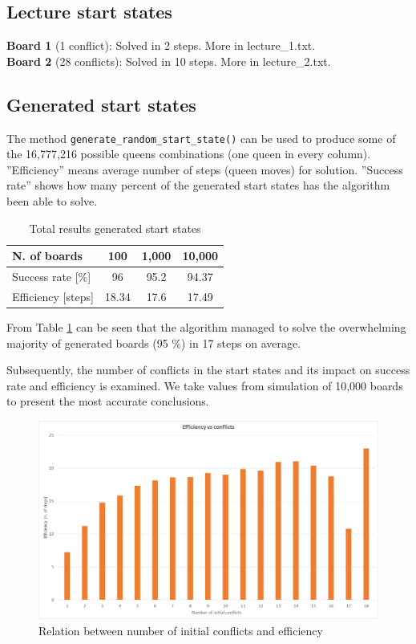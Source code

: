\documentclass[a4paper]{article}
\begin{document}
\subsection{Lecture start states}
\textbf{Board 1} (1 conflict): Solved in 2 steps. More in lecture\_1.txt. \\
\textbf{Board 2} (28 conflicts): Solved in 10 steps. More in lecture\_2.txt.

\subsection{Generated start states}
The method \verb|generate_random_start_state()| can be used to produce some of the 16,777,216 possible queens combinations  (one queen in every column). ''Efficiency'' means average number of steps (queen moves) for solution. ''Success rate'' shows how many percent of the generated start states has the algorithm been able to solve.  

\renewcommand{\arraystretch}{1.5}
\begin{table}[h!]
\centering
\caption{Total results generated start states}
\label{table:totalres}
\begin{tabular}{ | l | c| c|c|}
\hline
N. of boards & 100 & 1,000 & 10,000 \\ 
\hline
Success rate [\%] & 96 & 95.2 & 94.37 \\
Efficiency [steps] & 18.34 & 17.6 & 17.49 \\
\hline
\end{tabular}
\end{table}

From Table \ref{table:totalres} can be seen that the algorithm managed to solve the overwhelming majority of generated boards (95 \%) in 17 steps on average. 

Subsequently, the number of conflicts in the start states and its impact on success rate and efficiency is examined. We take values from simulation of 10,000 boards to present the most accurate conclusions.

\begin{figure}[ht!]
\centering
\includegraphics[width=\textwidth]{eff-chart.png}
\caption{Relation between number of initial conflicts and efficiency} 
\label{fig:eff}
\end{figure}
\end{document}
